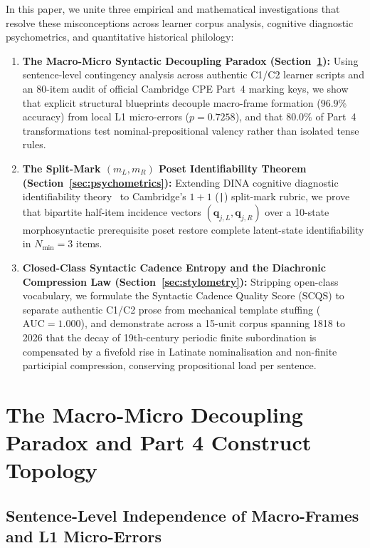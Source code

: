 \documentclass[11pt,reqno]{article}
\begin{document}
In this paper, we unite three empirical and mathematical investigations that resolve these misconceptions across learner corpus analysis, cognitive diagnostic psychometrics, and quantitative historical philology:
\begin{enumerate}
    \item \textbf{The Macro-Micro Syntactic Decoupling Paradox (Section~\ref{sec:decoupling}):} Using sentence-level contingency analysis across authentic C1/C2 learner scripts and an 80-item audit of official Cambridge CPE Part~4 marking keys, we show that explicit structural blueprints decouple macro-frame formation ($96.9\%$ accuracy) from local L1 micro-errors ($p = 0.7258$), and that $80.0\%$ of Part~4 transformations test nominal-prepositional valency rather than isolated tense rules.
    \item \textbf{The Split-Mark $(m_L, m_R)$ Poset Identifiability Theorem (Section~\ref{sec:psychometrics}):} Extending DINA cognitive diagnostic identifiability theory~\cite{DeLaTorre2009,GuXu2019} to Cambridge's $1+1$ (\texttt{|}) split-mark rubric, we prove that bipartite half-item incidence vectors $(\mathbf{q}_{j,L}, \mathbf{q}_{j,R})$ over a 10-state morphosyntactic prerequisite poset restore complete latent-state identifiability in $N_{\min} = 3$ items.
    \item \textbf{Closed-Class Syntactic Cadence Entropy and the Diachronic Compression Law (Section~\ref{sec:stylometry}):} Stripping open-class vocabulary, we formulate the Syntactic Cadence Quality Score ($\mathrm{SCQS}$) to separate authentic C1/C2 prose from mechanical template stuffing ($\mathrm{AUC} = 1.000$), and demonstrate across a 15-unit corpus spanning 1818 to 2026 that the decay of 19th-century periodic finite subordination is compensated by a fivefold rise in Latinate nominalisation and non-finite participial compression, conserving propositional load per sentence.
\end{enumerate}

\section{The Macro-Micro Decoupling Paradox and Part 4 Construct Topology}\label{sec:decoupling}

\subsection{Sentence-Level Independence of Macro-Frames and L1 Micro-Errors}
\end{document}
